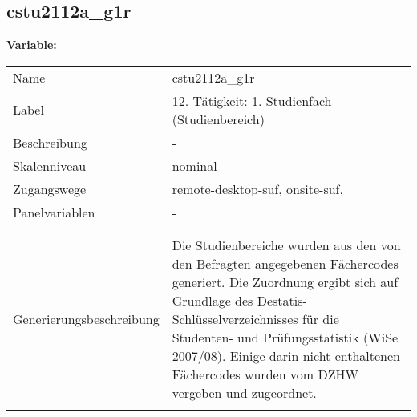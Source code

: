 	
	
	\subsection{cstu2112a\_g1r}
	\label{subSection:cstu2112a_g1r}

	\noindent\textbf{Variable:}\\
		\begin{tabular}{lL{11.3cm}}
			\label{tableVariable:cstu2112a_g1r}
			Name & cstu2112a\_g1r \\
			Label & 12. Tätigkeit: 1. Studienfach (Studienbereich) \\
			Beschreibung & - \\
			Skalenniveau & nominal \\
			Zugangswege &
				remote-desktop-suf,
				onsite-suf,
 \\
			Panelvariablen & -
			 \\
			 \\
 \\
					Generierungsbeschreibung & Die Studienbereiche wurden aus den von den Befragten angegebenen Fächercodes generiert. Die Zuordnung ergibt sich auf Grundlage des Destatis-Schlüsselverzeichnisses für die Studenten- und Prüfungsstatistik (WiSe 2007/08). Einige darin nicht enthaltenen Fächercodes wurden vom DZHW vergeben und zugeordnet. 
				 \\	
			 \\
		\end{tabular}






